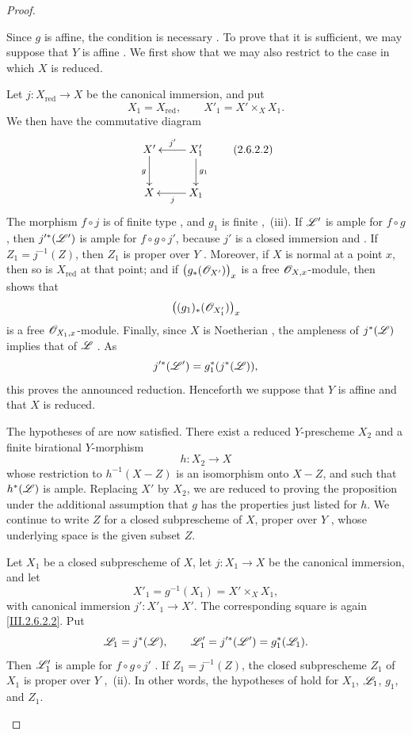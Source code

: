 \begin{proof}
\begin{env}[2.6.2.1]
\label{III.2.6.2.1}
Since $g$ is affine, the condition is necessary .
To prove that it is sufficient, we may suppose that $Y$ is affine
.
We first show that we may also restrict to the case in which $X$ is
reduced.

Let $j:X_{\mathrm{red}}\to X$ be the canonical immersion, and put
\[
  X_1=X_{\mathrm{red}},
  \qquad
  X'_1=X'\times_X X_1.
\]
We then have the commutative diagram
\[
  \xymatrix{
    X'\ar[d]_g &
    X'_1\ar[l]_{j'}\ar[d]^{g_1}\\
    X &
    X_1\ar[l]^{j}
  }
  \label{III.2.6.2.2}\tag{2.6.2.2}
\]
The morphism $f\circ j$ is of finite type , and
$g_1$ is finite ,~(iii).
If $\mathscr{L}'$ is ample for $f\circ g$, then
$j'^*(\mathscr{L}')$ is ample for $f\circ g\circ j'$, because $j'$ is a
closed immersion  and .
If $Z_1=j^{-1}(Z)$, then $Z_1$ is proper over $Y$
.
Moreover, if $X$ is normal at a point $x$, then so is $X_{\mathrm{red}}$
at that point; and if
$\bigl(g_*(\mathscr{O}_{X'})\bigr)_x$ is a free $\mathscr{O}_{X,x}$-module,
then  shows that
\[
  \bigl((g_1)_*(\mathscr{O}_{X'_1})\bigr)_x
\]
is a free $\mathscr{O}_{X_1,x}$-module.
Finally, since $X$ is Noetherian , the ampleness of
$j^*(\mathscr{L})$ implies that of $\mathscr{L}$ .
As
\[
  j'^*(\mathscr{L}')=g_1^*(j^*(\mathscr{L})),
\]
this proves the announced reduction.
Henceforth we suppose that $Y$ is affine and that $X$ is reduced.
\end{env}

The hypotheses of  are now satisfied.
There exist a reduced $Y$-prescheme $X_2$ and a finite birational
$Y$-morphism
\[
  h:X_2\to X
\]
whose restriction to $h^{-1}(X-Z)$ is an isomorphism onto $X-Z$, and
such that $h^*(\mathscr{L})$ is ample.
Replacing $X'$ by $X_2$, we are reduced to proving the proposition under
the additional assumption that $g$ has the properties just listed for
$h$.
We continue to write $Z$ for a closed subprescheme of $X$, proper over
$Y$ , whose underlying space is the given subset
$Z$.

\begin{env}[2.6.2.3]
\label{III.2.6.2.3}
Let $X_1$ be a closed subprescheme of $X$, let $j:X_1\to X$ be the
canonical immersion, and let
\[
  X'_1=g^{-1}(X_1)=X'\times_X X_1,
\]
with canonical immersion $j':X'_1\to X'$.
The corresponding square is again \eqref{III.2.6.2.2}.
Put
\[
  \mathscr{L}_1=j^*(\mathscr{L}),
  \qquad
  \mathscr{L}'_1=j'^*(\mathscr{L}')=g_1^*(\mathscr{L}_1).
\]
Then $\mathscr{L}'_1$ is ample for $f\circ g\circ j'$
.
If $Z_1=j^{-1}(Z)$, the closed subprescheme $Z_1$ of $X_1$ is proper
over $Y$ ,~(ii).
In other words, the hypotheses of  hold for
$X_1$, $\mathscr{L}_1$, $g_1$, and $Z_1$.
\end{env}


\end{proof}
